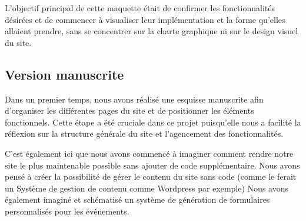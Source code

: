 L'objectif principal de cette maquette était de confirmer les fonctionnalités désirées et de commencer à visualiser leur implémentation et la forme qu'elles allaient prendre, sans se concentrer sur la charte graphique ni sur le design visuel du site.

\subsection{Version manuscrite}

Dans un premier temps, nous avons réalisé une esquisse manuscrite afin d’organiser les différentes pages du site et de positionner les éléments fonctionnels. Cette étape a été cruciale dans ce projet puisqu'elle nous a facilité la réflexion sur la structure générale du site et l'agencement des fonctionnalités.

C'est également ici que nous avons commencé à imaginer comment rendre notre site le plus maintenable possible sans ajouter de code supplémentaire. Nous avons pensé à créer la possibilité de gérer le contenu du site sans code (comme le ferait un Système de gestion de contenu comme Wordpress par exemple)
Nous avons également imaginé et schématisé un système de génération de formulaires personnalisés pour les événements.


